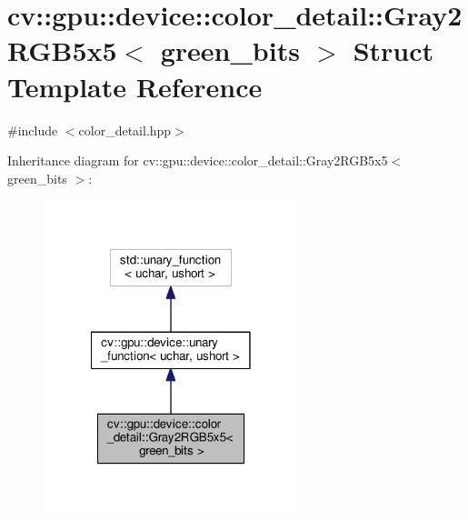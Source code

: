 \hypertarget{structcv_1_1gpu_1_1device_1_1color__detail_1_1Gray2RGB5x5}{\section{cv\-:\-:gpu\-:\-:device\-:\-:color\-\_\-detail\-:\-:Gray2\-R\-G\-B5x5$<$ green\-\_\-bits $>$ Struct Template Reference}
\label{structcv_1_1gpu_1_1device_1_1color__detail_1_1Gray2RGB5x5}
}


{\ttfamily \#include $<$color\-\_\-detail.\-hpp$>$}



Inheritance diagram for cv\-:\-:gpu\-:\-:device\-:\-:color\-\_\-detail\-:\-:Gray2\-R\-G\-B5x5$<$ green\-\_\-bits $>$\-:\nopagebreak
\begin{figure}[H]
\begin{center}
\leavevmode
\includegraphics[width=210pt]{structcv_1_1gpu_1_1device_1_1color__detail_1_1Gray2RGB5x5__inherit__graph}
\end{center}
\end{figure}


